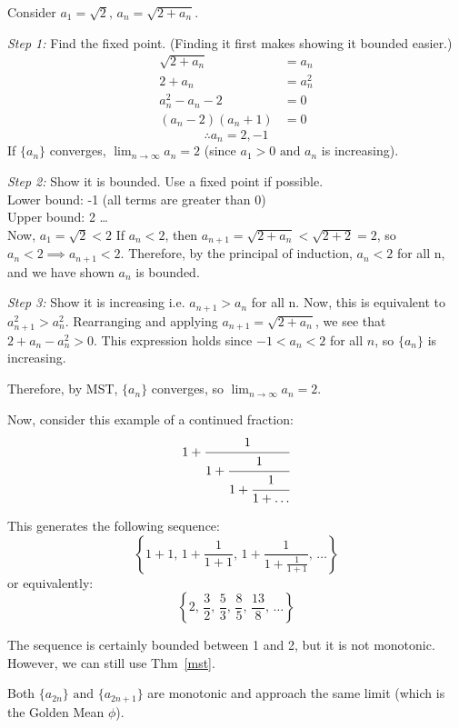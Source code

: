\documentclass[../main.tex]{subfiles}
\begin{document}
\begin{example}[]
    Consider \( a_1 = \sqrt{2}, \, a_n = \sqrt{2+a_n} \).

    \emph{Step 1:} Find the fixed point. (Finding it first makes showing it bounded easier.)
    \begin{align*}
        \sqrt{2+a_n} & = a_n \\
        2 + a_n & = a_n^2 \\
        a_n^2 - a_n -2 & = 0 \\
        (a_n-2)(a_n+1) & = 0
    \end{align*}
    \[ \therefore a_n = 2, -1 \]
    If \( \{a_n\} \) converges, \( \lim_{n \to \infty} a_n = 2 \) (since \( a_1 > 0 \text{ and } a_n \) is increasing).

    \emph{Step 2:} Show it is bounded. Use a fixed point if possible. \\
    Lower bound: -1 (all terms are greater than 0) \\
    Upper bound: 2 \dots \\
    Now, \( a_1 = \sqrt{2} < 2 \)
    If \( a_n < 2 \), then \( a_{n+1} = \sqrt{2+a_n} < \sqrt{2+2} = 2 \), so \( a_n<2 \implies a_{n+1}<2 \).
    Therefore, by the principal of induction, \( a_n<2 \) for all n, and we have shown \( a_n \) is bounded. \checkmark

    \emph{Step 3:} Show it is increasing i.e. \( a_{n+1} > a_n \) for all n.
    Now, this is equivalent to \( a_{n+1}^2 > a_n^2 \). Rearranging and applying \( a_{n+1} = \sqrt{2+a_n} \), we see that \( 2+a_n-a_n^2 > 0 \).
    This expression holds since \( -1 < a_n < 2 \) for all \( n \), so \( \{a_n\} \) is increasing.

    Therefore, by MST, \( \{a_n\} \) converges, so \( \lim_{n \to \infty} a_n = 2 \).
\end{example}

Now, consider this example of a continued fraction:
\[ \displaystyle 1 + \cfrac{1}{1+\cfrac{1}{1+\cfrac{1}{1+\dots}}} \]

This generates the following sequence:
\[ \left\{ 1+1, \, 1+ \frac{1}{1+1}, \, 1+\frac{1}{1+\frac{1}{1+1}}, \, \dots \right\} \]
or equivalently:
\[ \left\{ 2, \, \frac{3}{2}, \, \frac{5}{3}, \, \frac{8}{5}, \, \frac{13}{8}, \, \dots \right\} \]

The sequence is certainly bounded between 1 and 2, but it is not monotonic. However, we can still use Thm~\ref{mst}.

Both \( \{a_{2n}\} \text{ and } \{a_{2n+1}\} \) are monotonic and approach the same limit (which is the Golden Mean \( \phi \)).
\end{document}
